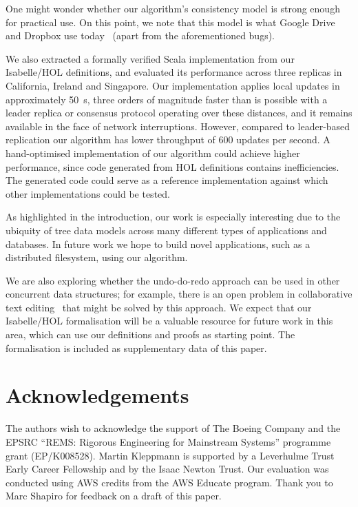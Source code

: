 \documentclass[10pt,journal,compsoc]{IEEEtran}
\begin{document}
One might wonder whether our algorithm's consistency model is strong enough for practical use.
On this point, we note that this model is what Google Drive and Dropbox use today~\cite{Hughes:2016fp} (apart from the aforementioned bugs).

We also extracted a formally verified Scala implementation from our Isabelle/HOL definitions, and evaluated its performance across three replicas in California, Ireland and Singapore.
Our implementation applies local updates in approximately 50~{\textmu}s, three orders of magnitude faster than is possible with a leader replica or consensus protocol operating over these distances, and it remains available in the face of network interruptions.
However, compared to leader-based replication our algorithm has lower throughput of 600 updates per second.
A hand-optimised implementation of our algorithm could achieve higher performance, since code generated from HOL definitions contains inefficiencies.
The generated code could serve as a reference implementation against which other implementations could be tested.

As highlighted in the introduction, our work is especially interesting due to the ubiquity of tree data models across many different types of applications and databases.
In future work we hope to build novel applications, such as a distributed filesystem, using our algorithm.

We are also exploring whether the undo-do-redo approach can be used in other concurrent data structures; for example, there is an open problem in collaborative text editing~\cite{Kleppmann:2020jw} that might be solved by this approach.
We expect that our Isabelle/HOL formalisation will be a valuable resource for future work in this area, which can use our definitions and proofs as starting point.
The formalisation is included as supplementary data of this paper.

\section*{Acknowledgements}

The authors wish to acknowledge the support of The Boeing Company and the EPSRC ``REMS: Rigorous Engineering for Mainstream Systems'' programme grant (EP/K008528).
Martin Kleppmann is supported by a Leverhulme Trust Early Career Fellowship and by the Isaac Newton Trust.
Our evaluation was conducted using AWS credits from the AWS Educate program.
Thank you to Marc Shapiro for feedback on a draft of this paper.
\end{document}
